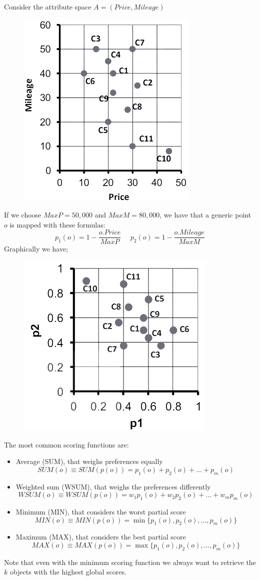 \documentclass[12pt, a4paper]{report}
\newtheorem[style=M,bodystyle=\normalfont]{theorem}{Theorem}
\newtheorem[style=M,bodystyle=\normalfont]{corollary}{Corollary}
\newtheorem[style=M,bodystyle=\normalfont]{lemma}{Lemma}
\newtheorem[style=M,bodystyle=\normalfont]{definition}{Definition}
\begin{document}
    \begin{example}
        Consider the attribute space $A = (Price,Mileage)$
        \begin{figure}[H]
            \centering
            \includegraphics[width=0.25\linewidth]{images/ex1.png}
        \end{figure}
        If we choose $MaxP = 50,000$ and $MaxM = 80,000$, we have that a generic point $o$ is mapped with these formulas: 
        \[p_1(o) = 1 - \dfrac{o.Price}{MaxP} \:\:\:\:\:\: p_2(o) = 1 - \dfrac{o.Mileage}{MaxM}\]
        Graphically we have; 
        \begin{figure}[H]
            \centering
            \includegraphics[width=0.3\linewidth]{images/ex2.png}
        \end{figure}
    \end{example}
    The most common scoring functions are: 
    \begin{itemize}
        \item Average (SUM), that weighs preferences equally
            \[SUM(o) \equiv SUM(p(o)) = p_1(o) + p_2(o) + \dots + p_m(o)\]
        \item Weighted sum (WSUM), that weighs the preferences differently
            \[WSUM(o) \equiv WSUM(p(o)) = w_1p_1(o) + w_2p_2(o) + \dots + w_mp_m(o)\]
        \item Minimum (MIN), that considers the worst partial score
            \[MIN(o) \equiv MIN(p(o)) = \min\{p_1(o),p_2(o),\dots, p_m(o)\}\]
        \item Maximum (MAX), that considers the best partial score
            \[MAX(o) \equiv MAX(p(o)) = \max\{p_1(o),p_2(o),\dots, p_m(o)\}\]       
    \end{itemize}
    Note that even with the minimum scoring function we always want to retrieve the $k$ objects with the highest global scores.
\end{document}
